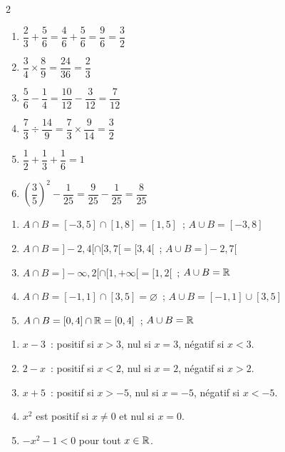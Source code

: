 \begin{multicols}{2}
\begin{enumerate}
  \item $\dfrac{2}{3}+\dfrac{5}{6}=\dfrac{4}{6}+\dfrac{5}{6}=\dfrac{9}{6}=\dfrac{3}{2}$
  \item $\dfrac{3}{4}\times\dfrac{8}{9}=\dfrac{24}{36}=\dfrac{2}{3}$
  \item $\dfrac{5}{6}-\dfrac{1}{4}=\dfrac{10}{12}-\dfrac{3}{12}=\dfrac{7}{12}$
  \item $\dfrac{7}{3}\div\dfrac{14}{9}=\dfrac{7}{3}\times\dfrac{9}{14}=\dfrac{3}{2}$
  \item $\dfrac{1}{2}+\dfrac{1}{3}+\dfrac{1}{6}=1$
  \item $\left(\dfrac{3}{5}\right)^2-\dfrac{1}{25}=\dfrac{9}{25}-\dfrac{1}{25}=\dfrac{8}{25}$
\end{enumerate}
\end{multicols}


\begin{enumerate}
  \item $A\cap B=[-3,5]\cap[1,8]=[1,5]$~; $A\cup B=[-3,8]$
  \item $A\cap B=]-2,4[\cap[3,7[=[3,4[$~; $A\cup B=]-2,7[$
  \item $A\cap B=]-\infty,2[\cap[1,+\infty[=[1,2[$~; $A\cup B=\mathbb{R}$
  \item $A\cap B=[-1,1]\cap[3,5]=\varnothing$~; $A\cup B=[-1,1]\cup[3,5]$
  \item $A\cap B=[0,4]\cap\mathbb{R}=[0,4]$~; $A\cup B=\mathbb{R}$
\end{enumerate}


\begin{enumerate}
  \item $x-3$~: positif si $x>3$, nul si $x=3$, n\'egatif si $x<3$.
  \item $2-x$~: positif si $x<2$, nul si $x=2$, n\'egatif si $x>2$.
  \item $x+5$~: positif si $x>-5$, nul si $x=-5$, n\'egatif si $x<-5$.
  \item $x^2$ est positif si $x\ne0$ et nul si $x=0$.
  \item $-x^2-1<0$ pour tout $x\in\mathbb{R}$.
\end{enumerate}

